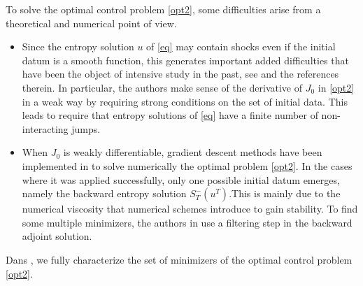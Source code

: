 \documentclass{article}
\begin{document}
\par To solve the optimal control problem \eqref{opt2}, some difficulties arise from a  theoretical  and  numerical point of view. 
\begin{itemize}
\item Since the  entropy solution $u$ of \eqref{eq} may contain shocks even if the initial datum is a smooth function, this generates important added difficulties that have been the object of intensive study in the past, see  \cite{BM95,BM95b,BJ98,BJ99} and the references therein. In particular, the authors make sense of the derivative of $J_0$ in \eqref{opt2} in a weak way by requiring  strong conditions on the set of initial data. This leads to require that entropy solutions of \eqref{eq} have a finite number of non-interacting jumps.
\item When $J_0$ is weakly differentiable,  gradient descent  methods have been implemented in \cite{CPZ08,CPZ10,APZ16a} to solve numerically the optimal problem \eqref{opt2}. In the cases where it was applied successfully, only one possible initial datum emerges, namely the backward entropy solution $S_T^-(u^T)$.This is mainly due to the numerical viscosity that numerical schemes introduce to gain stability. To find some multiple minimizers, the authors in  \cite{GZ17}  use a filtering step in the backward adjoint solution.   
\end{itemize}

Dans \cite{LZ19}, we fully characterize the set of minimizers of the optimal control problem \eqref{opt2}.
\end{document}
